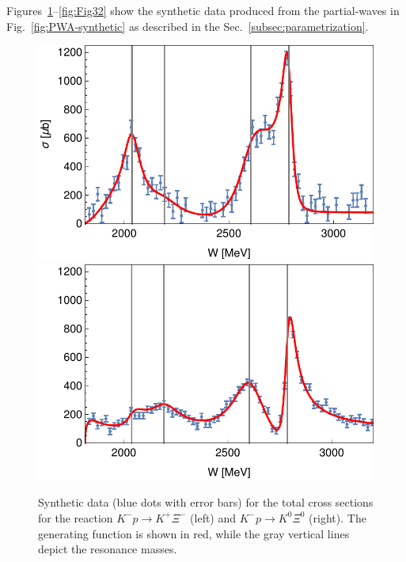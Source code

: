 \documentclass[10pt,aps,prc,superscriptaddress,twoside,twocolumn,nofootinbib,showpacs,preprintnumbers]{revtex4-1}
\begin{document}
Figures~\ref{fig:Fig2}--\ref{fig:Fig32} show the synthetic data produced from the partial-waves in Fig.~\ref{fig:PWA-synthetic} as described in the Sec.~\ref{subsec:parametrization}.



\begin{figure}[thb]
\centering
\includegraphics[width=.49\linewidth]{totCS-synth-1.pdf}
\includegraphics[width=.49\linewidth]{totCS-synth-2.pdf}
\caption{Synthetic data (blue dots with error bars) for the total cross sections for the reaction $K^-p\to K^+\Xi^-$ (left) and $K^-p\to K^0\Xi^0$ (right). The generating function is shown in red, while the gray vertical lines depict the resonance masses.}
\label{fig:Fig2}
\end{figure}
\end{document}
